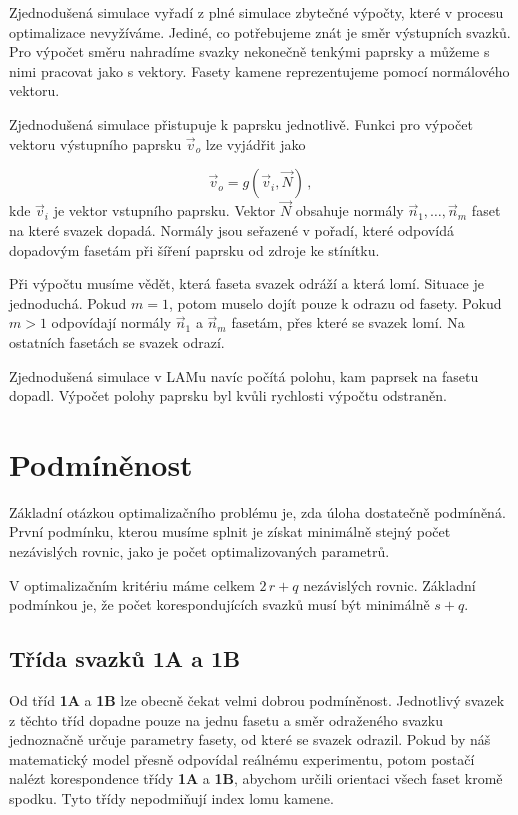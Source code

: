 Zjednodušená simulace vyřadí z plné simulace zbytečné výpočty, které v procesu optimalizace nevyžíváme. 
Jediné, co potřebujeme znát je směr výstupních svazků. Pro výpočet směru nahradíme svazky nekonečně tenkými paprsky a můžeme s nimi pracovat jako s vektory. Fasety kamene reprezentujeme pomocí normálového vektoru. 

Zjednodušená simulace přistupuje k paprsku jednotlivě. Funkci pro výpočet vektoru výstupního paprsku $\vec{v}_o$ lze vyjádřit jako  

\begin{equation}
\vec{v}_o= g\left(\vec{v}_i,\vec{N} \right)\,,
\end{equation}
kde $\vec{v}_i$ je vektor vstupního paprsku. Vektor $\vec{N}$ obsahuje normály $\vec{n}_1,\dots,\vec{n}_m$ faset na které svazek dopadá. Normály jsou seřazené v pořadí, které odpovídá dopadovým fasetám při šíření paprsku od zdroje ke stínítku. 

Při výpočtu musíme vědět, která faseta svazek odráží a která lomí. Situace je jednoduchá. Pokud $m = 1$, potom muselo dojít pouze k odrazu od fasety. Pokud  $m > 1$  odpovídají normály $\vec{n}_1$ a $\vec{n}_m$ fasetám, přes které se svazek lomí. Na ostatních fasetách se svazek odrazí. 

Zjednodušená simulace v LAMu navíc počítá polohu, kam paprsek na fasetu dopadl. Výpočet polohy paprsku byl kvůli rychlosti výpočtu odstraněn.



\section{Podmíněnost}
Základní otázkou optimalizačního problému je, zda úloha dostatečně podmíněná. První podmínku, kterou musíme splnit je získat minimálně stejný počet nezávislých rovnic, jako je počet optimalizovaných parametrů. 

V optimalizačním kritériu máme celkem  $2\,r + q$ nezávislých rovnic. Základní podmínkou je, že počet korespondujících svazků musí být minimálně $ s+q $.

\subsection{Třída svazků \textbf{1A} a \textbf{1B}}
Od tříd \textbf{1A} a \textbf{1B} lze obecně čekat velmi dobrou podmíněnost. Jednotlivý svazek z těchto tříd dopadne pouze na jednu fasetu a směr odraženého svazku jednoznačně určuje parametry fasety, od které se svazek odrazil. Pokud by náš matematický model přesně odpovídal reálnému experimentu, potom postačí nalézt korespondence třídy \textbf{1A} a \textbf{1B}, abychom určili orientaci všech faset kromě spodku. Tyto třídy nepodmiňují index lomu kamene.
 
